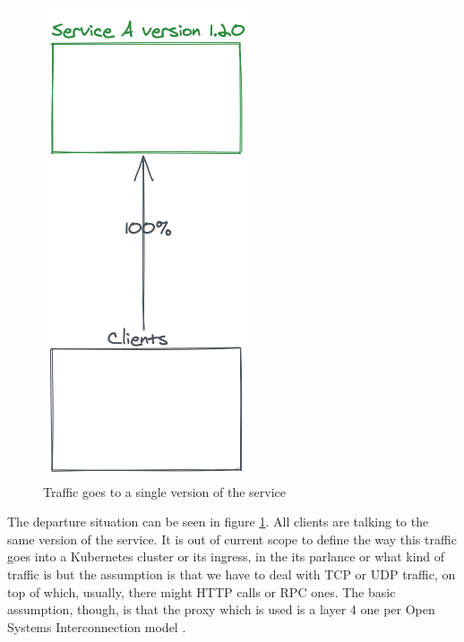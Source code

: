 \documentclass[conference]{IEEEtran}
\begin{document}
    \begin{figure}
        \centering
        \includegraphics[scale=0.25]{traffic100old.png}
        \caption{Traffic goes to a single version of the service}
        \label{fig:traffic100old}
    \end{figure}

    The departure situation can be seen in figure \ref{fig:traffic100old}. All clients are talking to the same version of the service. It is out of current scope to define the way this traffic goes into a Kubernetes cluster or its ingress, in the its parlance or what kind of traffic is but the assumption is that we have to deal with TCP or UDP traffic, on top of which, usually, there might HTTP calls or RPC ones. The basic assumption, though, is that the proxy which is used is a layer 4 one per Open Systems Interconnection model \cite{b14}.
\end{document}
